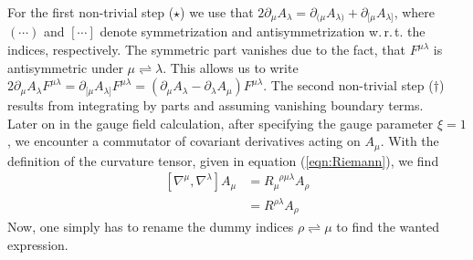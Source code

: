 For the first non-trivial step ($\star$) we use that $2\partial_{\mu}A_{\lambda} = \partial_{(\mu}A_{\lambda)} + \partial_{[\mu}A_{\lambda]}$, where $(\cdots)$ and $[\cdots]$ denote symmetrization and antisymmetrization w.\,r.\,t. the indices, respectively. The symmetric part vanishes due to the fact, that $F^{\mu\lambda}$ is antisymmetric under $\mu \rightleftharpoons \lambda$. This allows us to write $2\partial_{\mu}A_{\lambda}F^{\mu\lambda} = \partial_{[\mu}A_{\lambda]}F^{\mu\lambda} = \left(\partial_{\mu}A_{\lambda} - \partial_{\lambda}A_{\mu}\right)F^{\mu\lambda}$. The  second non-trivial step ($\dagger$) results from integrating by parts and assuming vanishing boundary terms. \\
Later on in the gauge field calculation, after specifying the gauge parameter $\xi=1$, we encounter a commutator of covariant derivatives acting on $A_{\mu}$. With the definition of the curvature tensor, given in equation (\ref{eqn:Riemann}), we find
\begin{equation}
\begin{aligned}
\left[\nabla^{\mu}, \nabla^{\lambda}\right]A_{\mu} &= R_{\mu}^{\phantom{\mu}\rho\mu\lambda}A_{\rho} \\
&= R^{\rho\lambda}A_{\rho} \label{eqn:RiemannB}
\end{aligned}	
\end{equation}
Now, one simply has to rename the dummy indices $\rho \rightleftharpoons \mu$ to find the wanted expression. 	